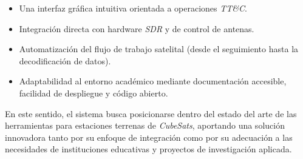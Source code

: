 \begin{itemize}
    \item Una interfaz gráfica intuitiva orientada a operaciones \textit{TT\&C}.
    \item Integración directa con hardware \textit{SDR} y de control de antenas.
    \item Automatización del flujo de trabajo satelital (desde el seguimiento hasta la decodificación de datos).
    \item Adaptabilidad al entorno académico mediante documentación accesible, facilidad de despliegue y código abierto.
\end{itemize}

En este sentido, el sistema busca posicionarse dentro del estado del arte de las herramientas para estaciones terrenas de \textit{CubeSats}, aportando una solución innovadora tanto por su enfoque de integración como por su adecuación a las necesidades de instituciones educativas y proyectos de investigación aplicada.
